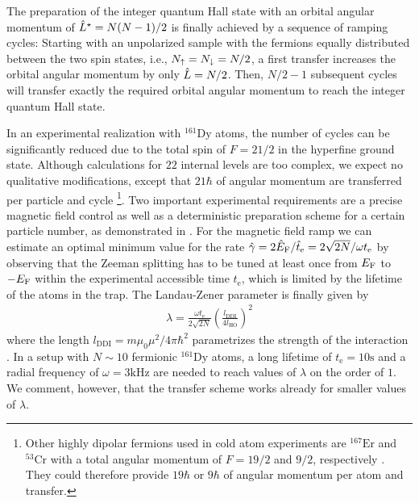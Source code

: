 The preparation of the integer quantum Hall state with an orbital angular momentum of ${\hat L}^{\star} = N(N-1)/2$ is finally achieved by a sequence of ramping cycles: Starting with an unpolarized sample with the fermions equally distributed between the two spin states, i.e.,  $N_\uparrow=N_\downarrow=N/2$, a first transfer increases the orbital angular momentum by only ${\hat L}=N/2$. Then, $N/2-1$ subsequent cycles will transfer exactly the required orbital angular momentum to reach the integer quantum Hall state.

In an experimental realization with $^{161}\text{Dy}$ atoms, the number of cycles can be significantly reduced due to the total spin of $F=21/2$ in the hyperfine ground state. Although calculations for $22$ internal levels are too complex, we expect no qualitative modifications, except that $21\hbar$ of angular momentum are transferred per particle and cycle \footnote{Other highly dipolar fermions used in cold atom experiments are $^{167}\text{Er}$ and $^{53}\text{Cr}$ with a total angular momentum of $F=19/2$ and $9/2$, respectively \cite{Berglund2007,Chicireanu2006}. They could therefore provide $19\hbar$ or $9\hbar$ of angular momentum per atom and transfer.}. Two important experimental requirements are a precise magnetic field control \cite{Pasquiou2011} as well as a deterministic preparation scheme for a certain particle number, as demonstrated in \cite{Serwane2011}. For the magnetic field ramp we can estimate an optimal minimum value for the rate ${\hat \gamma}=2{\hat E}_\text{F}/{\hat t}_\text{e}=2\sqrt{2N}/\omega t_\text{e}$ by observing that the Zeeman splitting has to be tuned at least once from $E_\text{F}$ to $-E_\text{F}$ within the experimental accessible time $t_\text{e}$, which is limited by the lifetime of the atoms in the trap. The Landau-Zener parameter is finally given by
\begin{align*}
\lambda = \frac{\omega t_\text{e}}{2\sqrt{2N}} \left(\frac{l_\text{DDI}}{4 l_\text{HO}}\right)^2
\end{align*}
where the length $l_\text{DDI} = m\mu_0\mu^2/4\pi \hbar^2$ parametrizes the strength of the interaction \cite{Lu2012}. In a setup with $N\sim 10$ fermionic $^{161}\text{Dy}$ atoms, a long lifetime of $t_\text{e}=10\text{s}$ and a radial frequency of $\omega = 3\text{kHz}$ are needed to reach values of $\lambda$ on the order of $1$. We comment, however, that the transfer scheme works already for smaller values of $\lambda$.


